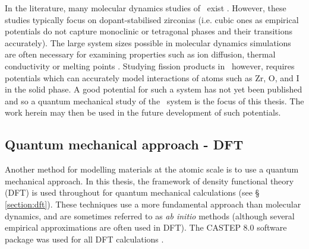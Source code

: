 In the literature, many molecular dynamics studies of \zirconia\ exist \cite{Schelling2004, Khan1998, Lee2013, Fisher1998, Pietrucci2008, Li1995, Miller2013, Aidhy2015}. However, these studies typically focus on dopant-stabilised zirconias (i.e. cubic ones as empirical potentials do not capture monoclinic or tetragonal phases and their transitions accurately). The large system sizes possible in molecular dynamics simulations are often necessary for examining properties such as ion diffusion, thermal conductivity or melting points \cite{Davis2010}. Studying fission products in \zirconia\ however, requires potentials which can accurately model interactions of atoms such as Zr, O, and I in the solid phase. A good potential for such a system has not yet been published and so a quantum mechanical study of the \zirconia\ system is the focus of this thesis. The work herein may then be used in the future development of such potentials.



\subsection{Quantum mechanical approach - DFT}

Another method for modelling materials at the atomic scale is to use a quantum mechanical approach. In this thesis, the framework of density functional theory (DFT) is used throughout for quantum mechanical calculations (see § \ref{section:dft}). These techniques use a more fundamental approach than molecular dynamics, and are sometimes referred to as \emph{ab initio} methods (although several empirical approximations are often used in DFT). The CASTEP 8.0 software package was used for all DFT calculations \cite{Clark2005}.

